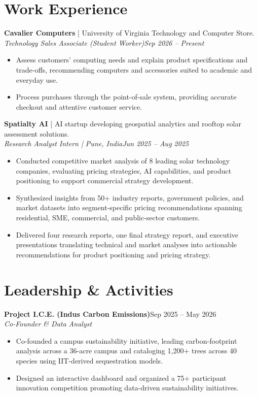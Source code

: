 \documentclass[10pt,letterpaper]{article}
\newcommand{\entry}[4]{\textbf{#1}\hfill #2\\\textit{#3}\hfill\textit{#4}\par}
\begin{document}
\section{Work Experience}
\textbf{Cavalier Computers} | University of Virginia Technology and Computer Store.\\
\textit{Technology Sales Associate (Student Worker)}\hfill\textit{Sep 2026 -- Present}
\begin{itemize}
\item Assess customers' computing needs and explain product specifications and trade-offs, recommending computers and \mbox{accessories} suited to academic and everyday use.
\item Process purchases through the point-of-sale system, providing accurate checkout and attentive customer service.
\end{itemize}
\vspace{5pt}
\textbf{Spatialty AI} | AI startup developing geospatial analytics and rooftop solar assessment solutions.\\
\textit{Research Analyst Intern | Pune, India}\hfill\textit{Jun 2025 -- Aug 2025}
\begin{itemize}
\item Conducted competitive market analysis of 8 leading solar technology companies, evaluating pricing strategies, AI capabilities, and product positioning to support commercial strategy development.
\item Synthesized insights from 50+ industry reports, government policies, and market datasets into segment-specific pricing recommendations spanning residential, SME, commercial, and public-sector customers.
\item Delivered four research reports, one final strategy report, and executive presentations translating technical and market analyses into actionable recommendations for product positioning and pricing strategy.
\end{itemize}
\section{Leadership \& Activities}
\entry{Project I.C.E. (Indus Carbon Emissions)}{Sep 2025 -- May 2026}{Co-Founder \& Data Analyst}{}
\begin{itemize}
\item Co-founded a campus sustainability initiative, leading carbon-footprint analysis across a 36-acre campus and cataloging 1,200+ trees across 40 species using IIT-derived sequestration models.
\item Designed an interactive dashboard and organized a 75+ participant innovation competition promoting data-driven sustainability initiatives.
\end{itemize}
\end{document}
